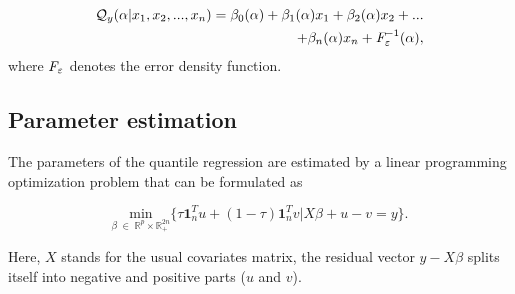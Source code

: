 \documentclass[a4paper]{IEEEtran}
\begin{document}
\begin{equation} 
	\begin{split}
	\mathcal{Q}_{y}(\alpha|x_{1}, x_{2}, ..., x_{n}) = \beta_{0}(\alpha) + \beta_{1}(\alpha)x_{1} + \beta_{2}(\alpha)x_{2} + ...\\ + \beta_{n}(\alpha)x_{n} + \emph{F}^{-1}_\varepsilon(\alpha), \label{eq:QR}
	\end{split}					
\end{equation}
\noindent
where $\emph{F}_\varepsilon$ denotes the error density function.

\subsection{Parameter estimation}\label{QR_estimation}
The parameters of the quantile regression are estimated by a linear programming optimization problem that can be formulated as

\begin{equation} 
	\underset{\beta \; \in \; \mathbb{R}^{p} \times \mathbb{R}^{2n}_{+} }{\text{min}} \{\tau \mathbf{1}_{n}^{T}u + (1-\tau)\mathbf{1}_{n}^{T}v | X\beta + u - v = y \} .\label{PL}
\end{equation}

Here, $X$ stands for the usual covariates matrix, the residual vector $ y-X\beta $ splits itself into negative and positive parts ($u$ and $v$).
\end{document}
